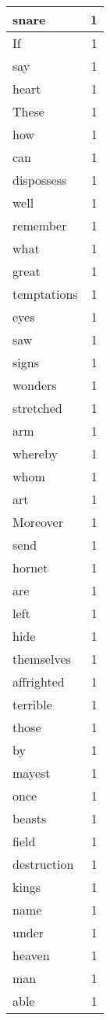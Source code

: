 \begin{center}
\begin{longtable}{l|r}
snare & 1 \\ \hline
If & 1 \\ \hline
say & 1 \\ \hline
heart & 1 \\ \hline
These & 1 \\ \hline
how & 1 \\ \hline
can & 1 \\ \hline
dispossess & 1 \\ \hline
well & 1 \\ \hline
remember & 1 \\ \hline
what & 1 \\ \hline
great & 1 \\ \hline
temptations & 1 \\ \hline
eyes & 1 \\ \hline
saw & 1 \\ \hline
signs & 1 \\ \hline
wonders & 1 \\ \hline
stretched & 1 \\ \hline
arm & 1 \\ \hline
whereby & 1 \\ \hline
whom & 1 \\ \hline
art & 1 \\ \hline
Moreover & 1 \\ \hline
send & 1 \\ \hline
hornet & 1 \\ \hline
are & 1 \\ \hline
left & 1 \\ \hline
hide & 1 \\ \hline
themselves & 1 \\ \hline
affrighted & 1 \\ \hline
terrible & 1 \\ \hline
those & 1 \\ \hline
by & 1 \\ \hline
mayest & 1 \\ \hline
once & 1 \\ \hline
beasts & 1 \\ \hline
field & 1 \\ \hline
destruction & 1 \\ \hline
kings & 1 \\ \hline
name & 1 \\ \hline
under & 1 \\ \hline
heaven & 1 \\ \hline
man & 1 \\ \hline
able & 1 \\ \hline

\end{longtable}
\end{center}
